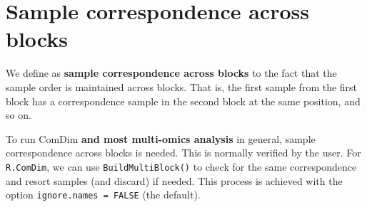 \documentclass[
]{book}
\begin{document}
\hypertarget{correspondence}{%
\section{Sample correspondence across blocks}\label{correspondence}}

We define as \textbf{sample correspondence across blocks} to the fact that the sample
order is maintained across blocks. That is, the first sample from the first
block has a correspondence sample in the second block at the same position, and
so on.

To run ComDim \textbf{and most multi-omics analysis} in general, sample
correspondence across blocks is needed. This is normally verified by the user.
For \texttt{R.ComDim}, we can use \texttt{BuildMultiBlock()} to check for the same
correspondence and resort samples (and discard) if needed. This process is
achieved with the option \texttt{ignore.names\ =\ FALSE} (the default).
\end{document}

